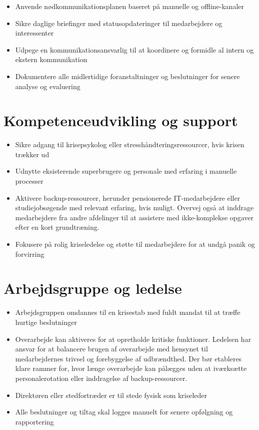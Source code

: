 \documentclass[a4paper,11pt,oneside]{book}
\def\tightlist{}
\begin{document}
\begin{itemize}
\tightlist
\item
  Anvende nødkommunikationsplanen baseret på manuelle og offline-kanaler
\item
  Sikre daglige briefinger med statusopdateringer til medarbejdere og
  interessenter
\item
  Udpege en kommunikationsansvarlig til at koordinere og formidle al
  intern og ekstern kommunikation
\item
  Dokumentere alle midlertidige foranstaltninger og beslutninger for
  senere analyse og evaluering
\end{itemize}

\section{Kompetenceudvikling og
support}\label{kompetenceudvikling-og-support}

\begin{itemize}
\tightlist
\item
  Sikre adgang til krisepsykolog eller stresshåndteringsressourcer, hvis
  krisen trækker ud
\item
  Udnytte eksisterende superbrugere og personale med erfaring i manuelle
  processer
\item
  Aktivere backup-ressourcer, herunder pensionerede IT-medarbejdere
  eller studiejobsøgende med relevant erfaring, hvis muligt. Overvej
  også at inddrage medarbejdere fra andre afdelinger til at assistere
  med ikke-komplekse opgaver efter en kort grundtræning.
\item
  Fokusere på rolig kriseledelse og støtte til medarbejdere for at undgå
  panik og forvirring
\end{itemize}

\section{Arbejdsgruppe og ledelse}\label{arbejdsgruppe-og-ledelse}

\begin{itemize}
\tightlist
\item
  Arbejdsgruppen omdannes til en krisestab med fuldt mandat til at
  træffe hurtige beslutninger
\item
  Overarbejde kan aktiveres for at opretholde kritiske funktioner.
  Ledelsen har ansvar for at balancere brugen af overarbejde med
  hensynet til medarbejdernes trivsel og forebyggelse af udbrændthed.
  Der bør etableres klare rammer for, hvor længe overarbejde kan
  pålægges uden at iværksætte personalerotation eller inddragelse af
  backup-ressourcer.
\item
  Direktøren eller stedfortræder er til stede fysisk som kriseleder
\item
  Alle beslutninger og tiltag skal logges manuelt for senere opfølgning
  og rapportering
\end{itemize}
\end{document}
